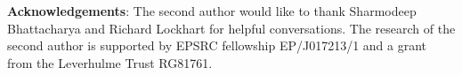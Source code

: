 \documentclass[a4paper,12pt]{article}
\begin{document}
\noindent \textbf{Acknowledgements}: The second author would like to thank Sharmodeep Bhattacharya and Richard Lockhart for helpful conversations.  The research of the second author is supported by EPSRC fellowship EP/J017213/1 and a grant from the Leverhulme Trust RG81761.




\end{document}
